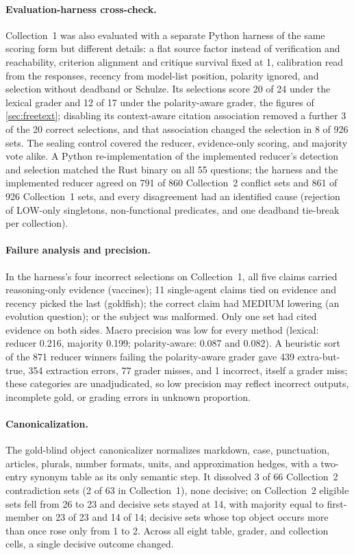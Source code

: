 \paragraph{Evaluation-harness cross-check.} Collection~1 was also evaluated with a separate Python harness of the same scoring form but different details: a flat source factor instead of verification and reachability, criterion alignment and critique survival fixed at 1, calibration read from the responses, recency from model-list position, polarity ignored, and selection without deadband or Schulze. Its selections score 20 of 24 under the lexical grader and 12 of 17 under the polarity-aware grader, the figures of \cref{sec:freetext}; disabling its context-aware citation association removed a further 3 of the 20 correct selections, and that association changed the selection in 8 of 926 sets. The sealing control covered the reducer, evidence-only scoring, and majority vote alike. A Python re-implementation of the implemented reducer's detection and selection matched the Rust binary on all 55 questions; the harness and the implemented reducer agreed on 791 of 860 Collection~2 conflict sets and 861 of 926 Collection~1 sets, and every disagreement had an identified cause (rejection of LOW-only singletons, non-functional predicates, and one deadband tie-break per collection).

\paragraph{Failure analysis and precision.} In the harness's four incorrect selections on Collection~1, all five claims carried reasoning-only evidence (vaccines); 11 single-agent claims tied on evidence and recency picked the last (goldfish); the correct claim had MEDIUM lowering (an evolution question); or the subject was malformed. Only one set had cited evidence on both sides. Macro precision was low for every method (lexical: reducer 0.216, majority 0.199; polarity-aware: 0.087 and 0.082). A heuristic sort of the 871 reducer winners failing the polarity-aware grader gave 439 extra-but-true, 354 extraction errors, 77 grader misses, and 1 incorrect, itself a grader miss; these categories are unadjudicated, so low precision may reflect incorrect outputs, incomplete gold, or grading errors in unknown proportion.

\paragraph{Canonicalization.} The gold-blind object canonicalizer normalizes markdown, case, punctuation, articles, plurals, number formats, units, and approximation hedges, with a two-entry synonym table as its only semantic step. It dissolved 3 of 66 Collection~2 contradiction sets (2 of 63 in Collection~1), none decisive; on Collection~2 eligible sets fell from 26 to 23 and decisive sets stayed at 14, with majority equal to first-member on 23 of 23 and 14 of 14; decisive sets whose top object occurs more than once rose only from 1 to 2. Across all eight table, grader, and collection cells, a single decisive outcome changed.

